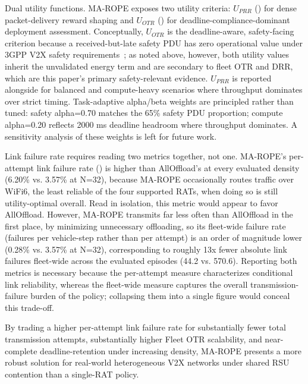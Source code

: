 Dual utility functions. MA-ROPE exposes two utility criteria: $U_{PRR}$ () for dense packet-delivery reward shaping and $U_{OTR}$ () for deadline-compliance-dominant deployment assessment. Conceptually, $U_{OTR}$ is the deadline-aware, safety-facing criterion because a received-but-late safety PDU has zero operational value under 3GPP V2X safety requirements~\cite{molina2017}; as noted above, however, both utility values inherit the unvalidated energy term and are secondary to fleet OTR and DRR, which are this paper's primary safety-relevant evidence. $U_{PRR}$ is reported alongside for balanced and compute-heavy scenarios where throughput dominates over strict timing. Task-adaptive alpha/beta weights are principled rather than tuned: safety alpha=0.70 matches the 65\% safety PDU proportion; compute alpha=0.20 reflects 2000 ms deadline headroom where throughput dominates. A sensitivity analysis of these weights is left for future work.

Link failure rate requires reading two metrics together, not one. MA-ROPE's per-attempt link failure rate () is higher than AllOffload's at every evaluated density (6.20\% vs. 3.57\% at N=32), because MA-ROPE occasionally routes traffic over WiFi6, the least reliable of the four supported RATs, when doing so is still utility-optimal overall. Read in isolation, this metric would appear to favor AllOffload. However, MA-ROPE transmits far less often than AllOffload in the first place, by minimizing unnecessary offloading, so its fleet-wide failure rate (failures per vehicle-step rather than per attempt) is an order of magnitude lower (0.28\% vs. 3.57\% at N=32), corresponding to roughly 13x fewer absolute link failures fleet-wide across the evaluated episodes (44.2 vs. 570.6). Reporting both metrics is necessary because the per-attempt measure characterizes conditional link reliability, whereas the fleet-wide measure captures the overall transmission-failure burden of the policy; collapsing them into a single figure would conceal this trade-off.

By trading a higher per-attempt link failure rate for substantially fewer total transmission attempts, substantially higher Fleet OTR scalability, and near-complete deadline-retention under increasing density, MA-ROPE presents a more robust solution for real-world heterogeneous V2X networks under shared RSU contention than a single-RAT policy.

